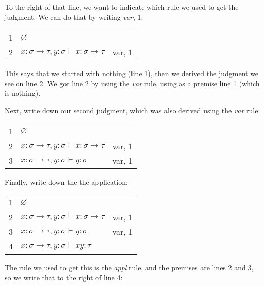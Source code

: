\documentclass{book}
\numberwithin{equation}{chapter}
\newenvironment{typederivation}
  {\begin{tabular}[t]{l l l}}
  {\end{tabular}}
\newcommand{\tdnum}[1]{#1}
\newcommand{\tdjudge}[1]{& #1}
\newcommand{\tdjustify}[1]{& #1 \\}
\begin{document}
\noindent
To the right of that line, we want to indicate which rule we used to get the judgment. We can do that by writing \textit{var}, 1:

\begin{center}
\begin{typederivation}

  \tdnum{1} \tdjudge{$\varnothing$} \tdjustify{}
  \tdnum{2} \tdjudge{$x : \sigma \rightarrow \tau, y : \sigma \vdash x : \sigma \rightarrow \tau$} \tdjustify{var, 1}

\end{typederivation}
\end{center}

\noindent
This says that we started with nothing (line 1), then we derived the judgment we see on line 2. We got line 2 by using the \textit{var} rule, using as a premise line 1 (which is nothing).

Next, write down our second judgment, which was also derived using the \textit{var} rule:

\begin{center}
\begin{typederivation}

  \tdnum{1} \tdjudge{$\varnothing$} \tdjustify{}
  \tdnum{2} \tdjudge{$x : \sigma \rightarrow \tau, y : \sigma \vdash x : \sigma \rightarrow \tau$} \tdjustify{var, 1}
  \tdnum{3} \tdjudge{$x : \sigma \rightarrow \tau, y : \sigma \vdash y : \sigma$} \tdjustify{var, 1}

\end{typederivation}
\end{center}

\noindent
Finally, write down the the application:

\begin{center}
\begin{typederivation}

  \tdnum{1} \tdjudge{$\varnothing$} \tdjustify{}
  \tdnum{2} \tdjudge{$x : \sigma \rightarrow \tau, y : \sigma \vdash x : \sigma \rightarrow \tau$} \tdjustify{var, 1}
  \tdnum{3} \tdjudge{$x : \sigma \rightarrow \tau, y : \sigma \vdash y : \sigma$} \tdjustify{var, 1}
  \tdnum{4} \tdjudge{$x : \sigma \rightarrow \tau, y : \sigma \vdash xy : \tau$} \tdjustify{}

\end{typederivation}
\end{center}

\noindent
The rule we used to get this is the \textit{appl} rule, and the premises are lines 2 and 3, so we write that to the right of line 4:
\end{document}
